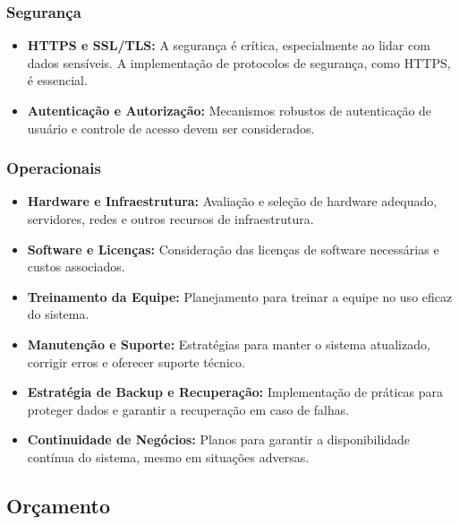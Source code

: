        \subsubsection{Segurança}
       
       \begin{itemize}
       	\item \textbf{HTTPS e SSL/TLS:} A segurança é crítica, especialmente ao lidar com dados sensíveis. A implementação de protocolos de segurança, como HTTPS, é essencial.
       	\item \textbf{Autenticação e Autorização:} Mecanismos robustos de autenticação de usuário e controle de acesso devem ser considerados.
       \end{itemize}
       
       \subsubsection{Operacionais}
       
       \begin{itemize}
       	\item \textbf{Hardware e Infraestrutura:} Avaliação e seleção de hardware adequado, servidores, redes e outros recursos de infraestrutura.
       	\item \textbf{Software e Licenças:} Consideração das licenças de software necessárias e custos associados.
       	\item \textbf{Treinamento da Equipe:} Planejamento para treinar a equipe no uso eficaz do sistema.
       	\item \textbf{Manutenção e Suporte:} Estratégias para manter o sistema atualizado, corrigir erros e oferecer suporte técnico.
       	\item \textbf{Estratégia de Backup e Recuperação:} Implementação de práticas para proteger dados e garantir a recuperação em caso de falhas.
       	\item \textbf{Continuidade de Negócios:} Planos para garantir a disponibilidade contínua do sistema, mesmo em situações adversas.
       \end{itemize} 
    
	       \subsection{Or\c{c}amento }
